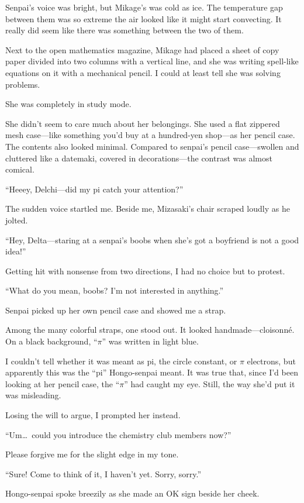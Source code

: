 \documentclass[
    a4paper,
    12pt,
    twoside,
    openany,
    UTF8,
    fontset=windows
]{ctexbook}
\begin{document}
Senpai's voice was bright, but Mikage's was cold as ice. The temperature gap between them was so extreme the air looked like it might start convecting. It really did seem like there was something between the two of them.

Next to the open mathematics magazine, Mikage had placed a sheet of copy paper divided into two columns with a vertical line, and she was writing spell-like equations on it with a mechanical pencil. I could at least tell she was solving problems.

She was completely in study mode.

She didn't seem to care much about her belongings. She used a flat zippered mesh case---like something you'd buy at a hundred-yen shop---as her pencil case. The contents also looked minimal. Compared to senpai's pencil case---swollen and cluttered like a datemaki, covered in decorations---the contrast was almost comical.

``Heeey, Delchi---did my pi catch your attention?''

The sudden voice startled me. Beside me, Mizasaki's chair scraped loudly as he jolted.

``Hey, Delta---staring at a senpai's boobs when she's got a boyfriend is not a good idea!''

Getting hit with nonsense from two directions, I had no choice but to protest.

``What do you mean, boobs? I'm not interested in anything.''

Senpai picked up her own pencil case and showed me a strap.

Among the many colorful straps, one stood out. It looked handmade---cloisonné. On a black background, ``$\pi$'' was written in light blue.

I couldn't tell whether it was meant as pi, the circle constant, or $\pi$ electrons, but apparently this was the ``pi'' Hongo-senpai meant. It was true that, since I'd been looking at her pencil case, the ``$\pi$'' had caught my eye. Still, the way she'd put it was misleading.

Losing the will to argue, I prompted her instead.

``Um\dots\ could you introduce the chemistry club members now?''

Please forgive me for the slight edge in my tone.

``Sure! Come to think of it, I haven't yet. Sorry, sorry.''

Hongo-senpai spoke breezily as she made an OK sign beside her cheek.
\end{document}
